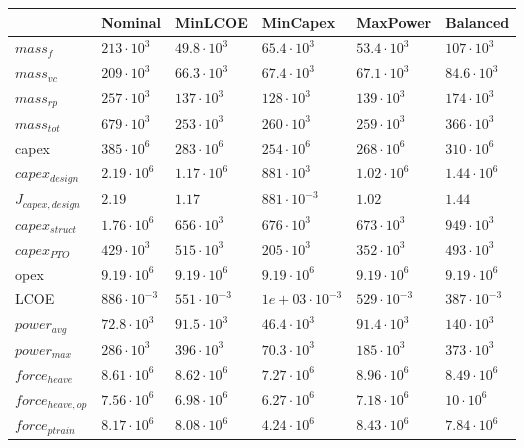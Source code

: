 \begin{tabular}{llllll}
& Nominal & MinLCOE & MinCapex & MaxPower & Balanced\\ 
\hline 
$mass_f$ & $213 \cdot 10^{3}$ & $49.8 \cdot 10^{3}$ & $65.4 \cdot 10^{3}$ & $53.4 \cdot 10^{3}$ & $107 \cdot 10^{3}$ \\ 
$mass_{vc}$ & $209 \cdot 10^{3}$ & $66.3 \cdot 10^{3}$ & $67.4 \cdot 10^{3}$ & $67.1 \cdot 10^{3}$ & $84.6 \cdot 10^{3}$ \\ 
$mass_{rp}$ & $257 \cdot 10^{3}$ & $137 \cdot 10^{3}$ & $128 \cdot 10^{3}$ & $139 \cdot 10^{3}$ & $174 \cdot 10^{3}$ \\ 
$mass_{tot}$ & $679 \cdot 10^{3}$ & $253 \cdot 10^{3}$ & $260 \cdot 10^{3}$ & $259 \cdot 10^{3}$ & $366 \cdot 10^{3}$ \\ 
capex & $385 \cdot 10^{6}$ & $283 \cdot 10^{6}$ & $254 \cdot 10^{6}$ & $268 \cdot 10^{6}$ & $310 \cdot 10^{6}$ \\ 
$capex_{design}$ & $2.19 \cdot 10^{6}$ & $1.17 \cdot 10^{6}$ & $881 \cdot 10^{3}$ & $1.02 \cdot 10^{6}$ & $1.44 \cdot 10^{6}$ \\ 
$J_{capex,design}$ & $2.19 $ & $1.17 $ & $881 \cdot 10^{-3}$ & $1.02 $ & $1.44 $ \\ 
$capex_{struct}$ & $1.76 \cdot 10^{6}$ & $656 \cdot 10^{3}$ & $676 \cdot 10^{3}$ & $673 \cdot 10^{3}$ & $949 \cdot 10^{3}$ \\ 
$capex_{PTO}$ & $429 \cdot 10^{3}$ & $515 \cdot 10^{3}$ & $205 \cdot 10^{3}$ & $352 \cdot 10^{3}$ & $493 \cdot 10^{3}$ \\ 
opex & $9.19 \cdot 10^{6}$ & $9.19 \cdot 10^{6}$ & $9.19 \cdot 10^{6}$ & $9.19 \cdot 10^{6}$ & $9.19 \cdot 10^{6}$ \\ 
LCOE & $886 \cdot 10^{-3}$ & $551 \cdot 10^{-3}$ & $1e+03 \cdot 10^{-3}$ & $529 \cdot 10^{-3}$ & $387 \cdot 10^{-3}$ \\ 
$power_{avg}$ & $72.8 \cdot 10^{3}$ & $91.5 \cdot 10^{3}$ & $46.4 \cdot 10^{3}$ & $91.4 \cdot 10^{3}$ & $140 \cdot 10^{3}$ \\ 
$power_{max}$ & $286 \cdot 10^{3}$ & $396 \cdot 10^{3}$ & $70.3 \cdot 10^{3}$ & $185 \cdot 10^{3}$ & $373 \cdot 10^{3}$ \\ 
$force_{heave}$ & $8.61 \cdot 10^{6}$ & $8.62 \cdot 10^{6}$ & $7.27 \cdot 10^{6}$ & $8.96 \cdot 10^{6}$ & $8.49 \cdot 10^{6}$ \\ 
$force_{heave,op}$ & $7.56 \cdot 10^{6}$ & $6.98 \cdot 10^{6}$ & $6.27 \cdot 10^{6}$ & $7.18 \cdot 10^{6}$ & $10 \cdot 10^{6}$ \\ 
$force_{ptrain}$ & $8.17 \cdot 10^{6}$ & $8.08 \cdot 10^{6}$ & $4.24 \cdot 10^{6}$ & $8.43 \cdot 10^{6}$ & $7.84 \cdot 10^{6}$ \\ 

\end{tabular}
